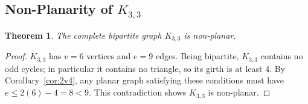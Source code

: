 \documentclass[12pt,a4paper]{article}
\theoremstyle{definition}
\theoremstyle{plain}
\newtheorem{theorem}{Theorem}[section]
\theoremstyle{remark}
\begin{document}
\subsection{Non-Planarity of $K_{3,3}$}

\begin{theorem}\label{thm:K33-nonplanar}
  The complete bipartite graph $K_{3,3}$ is non-planar.
\end{theorem}

\begin{proof}
  $K_{3,3}$ has $v=6$ vertices and $e=9$ edges.  Being bipartite, $K_{3,3}$
  contains no odd cycles; in particular it contains no triangle, so its girth
  is at least $4$.  By Corollary~\ref{cor:2v4}, any planar graph satisfying
  these conditions must have $e \leq 2(6)-4 = 8 < 9$.  This contradiction shows
  $K_{3,3}$ is non-planar.
\end{proof}
\end{document}
